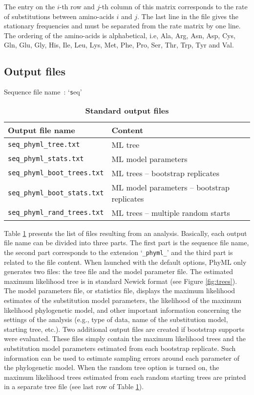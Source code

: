 \documentclass[a4paper,12pt]{article}
\newcommand{\x}[1]{\texttt{#1}}
\begin{document}
The  entry  on the  $i$-th  row  and  $j$-th  column of  this  matrix  corresponds  to the  rate  of
substitutions between  amino-acids $i$  and $j$.   The last line  in the  file gives  the stationary
frequencies and must be separated from the rate  matrix by one line. The ordering of the amino-acids
is alphabetical,  i.e, Ala, Arg, Asn, Asp,  Cys, Gln, Glu, Gly,  His, Ile, Leu, Lys,  Met, Phe, Pro,
Ser, Thr, Trp, Tyr and Val.

\subsection{Output files}

\begin{table}
Sequence file name~: `{\x seq}'\\
\begin{center}
\begin{tabular}{ll}
\hline
Output file name & Content \\
\hline
\x{seq\_phyml\_tree.txt} & ML tree\\
\x{seq\_phyml\_stats.txt} &  ML model parameters\\
\x{seq\_phyml\_boot\_trees.txt} & ML trees -- bootstrap replicates\\
\x{seq\_phyml\_boot\_stats.txt} & ML model parameters -- bootstrap replicates \\
\x{seq\_phyml\_rand\_trees.txt} & ML trees -- multiple random starts\\
\hline
\end{tabular}
\end{center}
\caption{{\bf Standard output files}}\label{tab:output}
\end{table}

Table  \ref{tab:output} presents  the list  of files  resulting from  an analysis.   Basically, each
output file  name can be divided into  three parts.  The first  part is the sequence  file name, the
second part corresponds to  the extension `\x{\_phyml\_}' and the third part  is related to the file
content.  When launched with the default options,  PhyML only generates two files: the tree file and
the model parameter file.   The estimated maximum likelihood tree is in  standard Newick format (see
Figure  \ref{fig:trees}).  The  model  parameters file,  or  statistics file,  displays the  maximum
likelihood estimates of the substitution model  parameters, the likelihood of the maximum likelihood
phylogenetic model, and  other important information concerning the settings  of the analysis (e.g.,
type of data, name of the substitution model, starting tree, etc.).  Two additional output files are
created if  bootstrap supports were  evaluated.  These files  simply contain the  maximum likelihood
trees  and  the  substitution  model  parameters  estimated from  each  bootstrap  replicate.   Such
information can be used to estimate sampling errors around each parameter of the phylogenetic model.
When the random  tree option is turned on,  the maximum likelihood trees estimated  from each random
starting trees are printed in a separate tree file (see last row of Table \ref{tab:output}).
\end{document}
